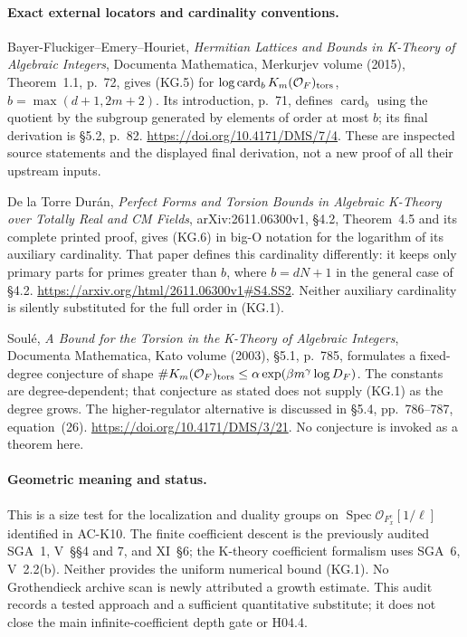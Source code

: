 \paragraph{Exact external locators and cardinality conventions.}
Bayer-Fluckiger--Emery--Houriet, \emph{Hermitian Lattices and Bounds
in K-Theory of Algebraic Integers}, Documenta Mathematica,
Merkurjev volume (2015), Theorem~1.1, p.~72, gives (KG.5)
for $\log\operatorname{card}_bK_m(\mathcal O_F)_{\rm tors}$,
$b=\max(d+1,2m+2)$.  Its introduction, p.~71, defines
$\operatorname{card}_b$ using the quotient by the subgroup
generated by elements of order at most $b$; its final
derivation is \S5.2, p.~82.
\url{https://doi.org/10.4171/DMS/7/4}.
These are inspected source statements and the displayed
final derivation, not a new proof of all their upstream inputs.

De la Torre Dur\'an, \emph{Perfect Forms and Torsion Bounds in
Algebraic K-Theory over Totally Real and CM Fields},
arXiv:2611.06300v1, \S4.2, Theorem~4.5 and its complete printed
proof, gives (KG.6) in big-O notation for the logarithm of its
auxiliary cardinality.  That paper defines this cardinality differently:
it keeps only primary parts for primes greater than $b$,
where $b=dN+1$ in the general case of \S4.2.
\url{https://arxiv.org/html/2611.06300v1#S4.SS2}.
Neither auxiliary cardinality is silently substituted for
the full order in (KG.1).

Soul\'e, \emph{A Bound for the Torsion in the K-Theory of
Algebraic Integers}, Documenta Mathematica, Kato volume
(2003), \S5.1, p.~785, formulates a fixed-degree conjecture
of shape $\#K_m(\mathcal O_F)_{\rm tors}
\leq\alpha\exp(\beta m^\gamma\log D_F)$.
The constants are degree-dependent; that conjecture as
stated does not supply (KG.1) as the degree grows.
The higher-regulator alternative is discussed in \S5.4,
pp.~786--787, equation~(26).
\url{https://doi.org/10.4171/DMS/3/21}.
No conjecture is invoked as a theorem here.

\paragraph{Geometric meaning and status.}
This is a size test for the localization and duality groups on
$\operatorname{Spec}\mathcal O_{F_x^{\mathrm c}}[1/\ell]$
identified in AC-K10.  The finite coefficient descent is the
previously audited SGA~1, V~\S\S4 and 7, and XI~\S6;
the K-theory coefficient formalism uses SGA~6, V~2.2(b).
Neither provides the uniform numerical bound (KG.1).
No Grothendieck archive scan is newly attributed a growth
estimate.  This audit records a tested approach and a
sufficient quantitative substitute; it does not close the
main infinite-coefficient depth gate or H04.4.
